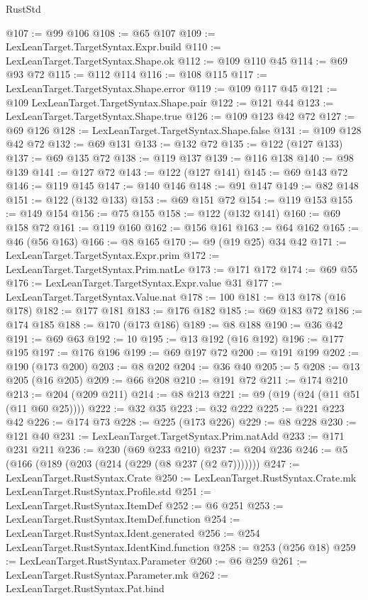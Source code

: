 \begin{lexlean}{RustStd}
\begin{coremodule}
{\begin{coremodule}
{{{{{{{{{{@107 := @99 @106
@108 := @65 @107
@109 := LexLeanTarget.TargetSyntax.Expr.build
@110 := LexLeanTarget.TargetSyntax.Shape.ok
@112 := @109 @110 @45
@114 := @69 @93 @72
@115 := @112 @114
@116 := @108 @115
@117 := LexLeanTarget.TargetSyntax.Shape.error
@119 := @109 @117 @45
@121 := @109 LexLeanTarget.TargetSyntax.Shape.pair
@122 := @121 @44
@123 := LexLeanTarget.TargetSyntax.Shape.true
@126 := @109 @123 @42 @72
@127 := @69 @126
@128 := LexLeanTarget.TargetSyntax.Shape.false
@131 := @109 @128 @42 @72
@132 := @69 @131
@133 := @132 @72
@135 := @122 (@127 @133)
@137 := @69 @135 @72
@138 := @119 @137
@139 := @116 @138
@140 := @98 @139
@141 := @127 @72
@143 := @122 (@127 @141)
@145 := @69 @143 @72
@146 := @119 @145
@147 := @140 @146
@148 := @91 @147
@149 := @82 @148
@151 := @122 (@132 @133)
@153 := @69 @151 @72
@154 := @119 @153
@155 := @149 @154
@156 := @75 @155
@158 := @122 (@132 @141)
@160 := @69 @158 @72
@161 := @119 @160
@162 := @156 @161
@163 := @64 @162
@165 := @46 (@56 @163)
@166 := @8 @165
@170 := @9 (@19 @25) @34 @42
@171 := LexLeanTarget.TargetSyntax.Expr.prim
@172 := LexLeanTarget.TargetSyntax.Prim.natLe
@173 := @171 @172
@174 := @69 @55
@176 := LexLeanTarget.TargetSyntax.Expr.value @31
@177 := LexLeanTarget.TargetSyntax.Value.nat
@178 := 100
@181 := @13 @178 (@16 @178)
@182 := @177 @181
@183 := @176 @182
@185 := @69 @183 @72
@186 := @174 @185
@188 := @170 (@173 @186)
@189 := @8 @188
@190 := @36 @42
@191 := @69 @63
@192 := 10
@195 := @13 @192 (@16 @192)
@196 := @177 @195
@197 := @176 @196
@199 := @69 @197 @72
@200 := @191 @199
@202 := @190 (@173 @200)
@203 := @8 @202
@204 := @36 @40
@205 := 5
@208 := @13 @205 (@16 @205)
@209 := @66 @208
@210 := @191 @72
@211 := @174 @210
@213 := @204 (@209 @211)
@214 := @8 @213
@221 := @9 (@19 (@24 (@11 @51 (@11 @60 @25))))
@222 := @32 @35
@223 := @32 @222
@225 := @221 @223 @42
@226 := @174 @73
@228 := @225 (@173 @226)
@229 := @8 @228
@230 := @121 @40
@231 := LexLeanTarget.TargetSyntax.Prim.natAdd
@233 := @171 @231 @211
@236 := @230 (@69 @233 @210)
@237 := @204 @236
@246 := @5 (@166 (@189 (@203 (@214 (@229 (@8 @237 (@2 @7)))))))
@247 := LexLeanTarget.RustSyntax.Crate
@250 := LexLeanTarget.RustSyntax.Crate.mk LexLeanTarget.RustSyntax.Profile.std
@251 := LexLeanTarget.RustSyntax.ItemDef
@252 := @6 @251
@253 := LexLeanTarget.RustSyntax.ItemDef.function
@254 := LexLeanTarget.RustSyntax.Ident.generated
@256 := @254 LexLeanTarget.RustSyntax.IdentKind.function
@258 := @253 (@256 @18)
@259 := LexLeanTarget.RustSyntax.Parameter
@260 := @6 @259
@261 := LexLeanTarget.RustSyntax.Parameter.mk
@262 := LexLeanTarget.RustSyntax.Pat.bind
}}}}}}}}}}
\end{coremodule}}
\end{coremodule}
\end{lexlean}
